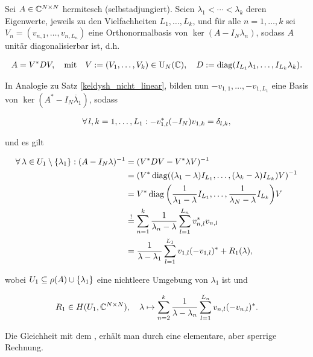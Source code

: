 \begin{remark} \label{keldysh_hermitesch}

    Sei $A \in \mathbb{C}^{N \times N}$ hermitesch (selbstadjungiert).
    Seien $\lambda_1 < \cdots < \lambda_k$ deren Eigenwerte, jeweils zu den Vielfachheiten $L_1, \dots, L_k$, und für alle $n = 1, \dots, k$ sei $V_n = (v_{n, 1}, \dots, v_{n, L_n})$ eine Orthonormalbasis von $\ker (A - I_N \lambda_n)$, sodass $A$ unitär diagonalisierbar ist, d.h.

    \begin{align*}
        A = V^\ast D V,
        \quad
        \text{mit}
        \quad
        V := (V_1, \dots, V_k) \in \operatorname{U}_N(\mathbb{C}),
        \quad
        D := \operatorname{diag} (I_{L_1} \lambda_1, \dots, I_{L_k} \lambda_k).
    \end{align*}

    In Analogie zu Satz \ref{keldysh_nicht_linear}, bilden nun $-v_{1, 1}, \dots, -v_{1, L_1}$ eine Basis von $\ker (A^\ast - I_N \overline \lambda_1)$, sodass

    \begin{align*}
        \forall \, l, k = 1, \dots, L_1:
            -v_{1, l}^\ast (-I_N) v_{1, k} = \delta_{l, k},
    \end{align*}

    und es gilt

    \begin{align*}
        \forall \, \lambda \in U_1 \setminus {\left \{ \lambda_1 \right \}}:
            (A - I_N \lambda)^{-1}
            & =
            (V^\ast D V - V^\ast \lambda V)^{-1} \\
            & =
            (V^\ast \operatorname{diag} ((\lambda_1 - \lambda) I_{L_1}, \dots, (\lambda_k - \lambda) I_{L_k}) V)^{-1} \\
            & =
            V^\ast \operatorname{diag} {\left ( \frac{1}{\lambda_1 - \lambda} I_{L_1}, \dots, \frac{1}{\lambda_N - \lambda} I_{L_k} \right )} V \\
            & \stackrel{!}{=}
            \sum_{n=1}^k
                \frac{1}{\lambda_n - \lambda}
                \sum_{l=1}^{L_n}
                    v_{n, l}^\ast v_{n, l} \\
            & =
            \frac{1}{\lambda - \lambda_1}
            \sum_{l=1}^{L_1}
                v_{1, l} (-v_{1, l})^\ast
            +
            R_1(\lambda),
    \end{align*}

    wobei $U_1 \subseteq \rho(A) \cup {\left \{ \lambda_1 \right \}}$ eine nichtleere Umgebung von $\lambda_1$ ist und

    \begin{align*}
        R_1 \in H(U_1, \mathbb{C}^{N \times N}),
        \quad
        \lambda
        \mapsto
        \sum_{n=2}^k
            \frac{1}{\lambda - \lambda_n}
            \sum_{l=1}^{L_n}
                v_{n, l} (-v_{n, l})^\ast.
    \end{align*}

    Die Gleichheit mit dem \Quote{!}, erhält man durch eine elementare, aber sperrige Rechnung.

\end{remark}